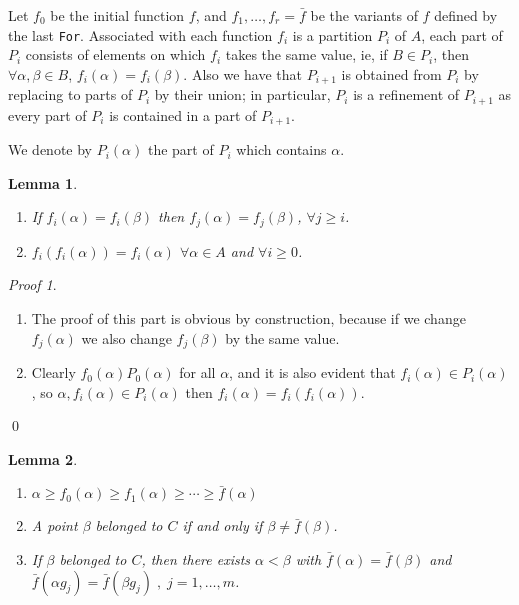 \documentclass[12pt,a4paper]{book}
\theoremstyle{plain}
\newtheorem{lema}{Lemma}
\theoremstyle{definition}
\theoremstyle{remark}
\newtheorem*{Proof}{Proof}
\begin{document}
Let $f_0$ be the initial function $f$, and $f_1, \ldots, f_r = \bar{f}$ be the variants of $f$ defined by the last \texttt{For}. Associated with 
each function $f_i$ is a partition $P_i$ of $A$, each part of $P_i$ consists of elements on which $f_i$ takes the same value, ie, if $B \in P_i$, 
then $\forall \alpha, \beta \in B$, $f_i (\alpha ) = f_i ( \beta)$.  Also we have that $P_{i+1}$ is obtained from $P_i$ by replacing to parts of $P_i$
 by their union; in particular, $P_i$ is a refinement of $P_{i+1}$ as every part of $P_i$ is contained in a part of $P_{i+1}$.

We denote by  $P_i ( \alpha)$  the part of $P_i$ which contains $\alpha$.

\begin{lema}
 \begin{enumerate}
  \item If $f_i( \alpha ) = f_i ( \beta) $ then $f_j ( \alpha ) = f_j ( \beta)$, $\forall j \geq i$.
 \item $f_i ( f_i ( \alpha ) ) = f_i ( \alpha)$ $\forall \alpha \in A $ and $\forall i \geq 0$.
 \end{enumerate}

\end{lema}
\begin{Proof}
 \begin{enumerate}
  \item The proof of this part is obvious by construction, because if we change $f_j( \alpha)$ we also change $f_j( \beta)$ by the same value.
  \item Clearly $f_0 ( \alpha )  P_0 ( \alpha)$ for all $\alpha$, and it is also evident that $f_i ( \alpha ) \in P_i( \alpha)$, so $ \alpha , 
f_i ( \alpha) \in P_i ( \alpha)$ then  $f_i ( \alpha ) = f_i ( f_i ( \alpha))$.
 \end{enumerate}
\qed  \end{Proof}

\begin{lema}
 \begin{enumerate}
  \item $\alpha \geq f_0 ( \alpha) \geq f_1 ( \alpha) \geq \cdots \geq \bar{f} ( \alpha)$
  \item A point $\beta$ belonged to $C$ if and only if $\beta \neq \bar{f} ( \beta)$.
  \item If $ \beta$ belonged to $C$, then there exists $\alpha < \beta $ with $\bar{f} ( \alpha ) = \bar{f} ( \beta)$ and $\bar{f} ( \alpha g_j ) = 
        \bar{f} ( \beta g_j )  \; ,  \; j = 1, \ldots , m$.
 \end{enumerate}

\end{lema}
\end{document}
